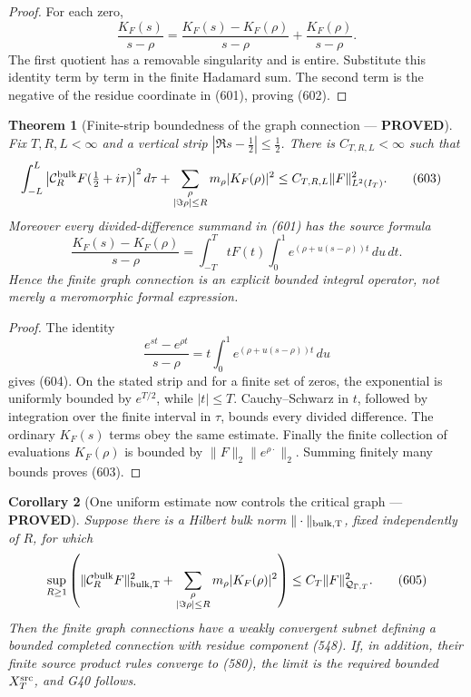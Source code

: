 \documentclass[11pt]{article}
\newtheorem{theorem}{Theorem}
\newtheorem{corollary}[theorem]{Corollary}
\newcommand{\PROVED}{\textcolor{green!45!black}{\textbf{PROVED}}}
\begin{document}
\begin{proof}
For each zero,
\[
 \frac{K_F(s)}{s-\rho}
 =\frac{K_F(s)-K_F(\rho)}{s-\rho}
  +\frac{K_F(\rho)}{s-\rho}.
\]
The first quotient has a removable singularity and is entire.  Substitute
this identity term by term in the finite Hadamard sum.  The second term is
the negative of the residue coordinate in (601), proving (602).
\end{proof}

\begin{theorem}[Finite-strip boundedness of the graph connection ---
\PROVED]
Fix \(T,R,L<\infty\) and a vertical strip
\(|\Re s-\frac12|\le\frac12\).  There is
\(C_{T,R,L}<\infty\) such that
\begin{align}
 &\int_{-L}^{L}
 \left|\mathcal C_R^{\rm bulk}F
       (\tfrac12+i\tau)\right|^2d\tau
 +\sum_{\substack{\rho\\|\Im\rho|\le R}}
       m_\rho|K_F(\rho)|^2
 \le C_{T,R,L}\|F\|_{L^2(I_T)}^2 .                  \tag{603}
\end{align}
Moreover every divided-difference summand in (601) has the source formula
\begin{equation}
 \frac{K_F(s)-K_F(\rho)}{s-\rho}
 =\int_{-T}^{T}tF(t)
   \int_0^1e^{(\rho+u(s-\rho))t}\,du\,dt .            \tag{604}
\end{equation}
Hence the finite graph connection is an explicit bounded integral operator,
not merely a meromorphic formal expression.
\end{theorem}

\begin{proof}
The identity
\[
 \frac{e^{st}-e^{\rho t}}{s-\rho}
 =t\int_0^1e^{(\rho+u(s-\rho))t}\,du
\]
gives (604).  On the stated strip and for a finite set of zeros,
the exponential is uniformly bounded by \(e^{T/2}\), while
\(|t|\le T\).  Cauchy--Schwarz in \(t\), followed by integration over the
finite interval in \(\tau\), bounds every divided difference.  The
ordinary \(K_F(s)\) terms obey the same estimate.  Finally the finite
collection of evaluations \(K_F(\rho)\) is bounded by
\(\|F\|_2\|e^{\rho\cdot}\|_2\).  Summing finitely many bounds proves (603).
\end{proof}

\begin{corollary}[One uniform estimate now controls the critical graph ---
\PROVED]
Suppose there is a Hilbert bulk norm \(\|\cdot\|_{\rm bulk,T}\), fixed
independently of \(R\), for which
\begin{equation}
 \sup_{R\ge1}\left(
 \|\mathcal C_R^{\rm bulk}F\|_{\rm bulk,T}^2+
 \sum_{\substack{\rho\\|\Im\rho|\le R}}
       m_\rho|K_F(\rho)|^2\right)
 \le C_T\|F\|_{\mathcal Q_{\Gamma,T}}^2.              \tag{605}
\end{equation}
Then the finite graph connections have a weakly convergent subnet defining
a bounded completed connection with residue component (548).  If, in
addition, their finite source product rules converge to (580), the limit is
the required bounded \(X_T^{\rm src}\), and G40 follows.
\end{corollary}
\end{document}
